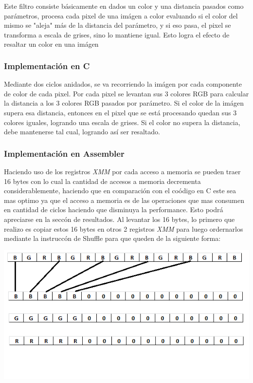 Este filtro consiste b\'asicamente en dados un color y una distancia pasados como par\'ametros, procesa cada pixel de una im\'agen a color evaluando si 
el color del mismo se "aleja" m\'as de la distancia del par\'ametro, y si eso pasa, el pixel se transforma a escala de grises, sino lo mantiene igual. 
Esto logra el efecto de resaltar un color en una im\'agen

\subsubsection{Implementación en C}
Mediante dos ciclos anidados, se va recorriendo la im\'agen por cada componente de color de cada pixel. Por cada pixel se levantan sus 3 colores RGB para 
calcular la distancia a los 3 colores RGB pasados por par\'ametro. Si el color de la im\'agen supera esa distancia, entonces en el pixel que se est\'a 
procesando quedan sus 3 colores iguales, logrando una escala de grises. Si el color no supera la distancia, debe mantenerse tal cual, logrando as\'i ser 
resaltado.

\subsubsection{Implementación en Assembler}
Haciendo uso de los registros \emph{XMM} por cada acceso a memoria se pueden traer 16 bytes con lo cual la cantidad de accesos a memoria decrementa 
considerablemente, haciendo que en comparaci\'on con el co\'odigo en C este sea mas optimo ya que el acceso a memoria es de las operaciones que mas 
consumen en cantidad de ciclos haciendo que disminuya la performance. Esto podr\'a apreciarse en la secc\'on de resultados.\newline
Al levantar los 16 bytes, lo primero que realizo es copiar estos 16 bytes en otros 2 registros \emph{XMM} para luego ordernarlos mediante la instrucc\'on
de Shuffle para que queden de la siguiente forma:

\begin{center}
\includegraphics{imagenes/ImagenReorden.png}  
\end{center}

